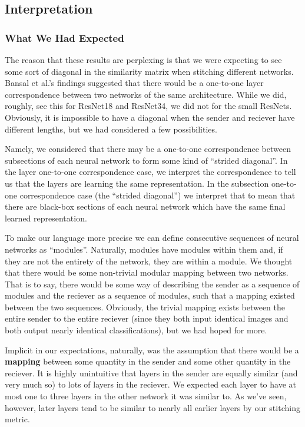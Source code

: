 \documentclass{article} %
\begin{document}
\subsection*{Interpretation}
\subsubsection*{What We Had Expected}
The reason that these results are perplexing is that we were expecting to see some sort of diagonal in the similarity matrix
when stitching
different networks. Bansal et al.'s findings suggested that there would be a one-to-one layer correspondence between
two networks of the same architecture. While we did, roughly, see this for ResNet18 and ResNet34, we did not for the
small ResNets. Obviously, it is impossible to have a diagonal when the sender and reciever have different lengths,
but we had considered a few possibilities.

Namely, we considered that there may be a one-to-one correspondence between subsections of each neural network to
form some kind of ``strided diagonal''. In the layer one-to-one correspondence case, we interpret the correspondence
to tell us that the layers are learning the same representation. In the subsection one-to-one correspondence case
(the ``strided diagonal'') we interpret that to mean that there are black-box sections of each neural network which
have the same final learned representation.

To make our language more precise we can define consecutive sequences of neural networks as ``modules''. Naturally,
modules have modules within them and, if they are not the entirety of the network, they are within a module. We thought
that there would be some non-trivial modular mapping between two networks. That is to say, there would be some way of
describing the sender as a sequence of modules and the reciever as a sequence of modules, such that a mapping existed
between the two sequences. Obviously, the trivial mapping exists between the entire sender to the entire reciever
(since they both input identical images and both output nearly identical classifications), but we had hoped for more.

Implicit in our expectations, naturally, was the assumption that there would be a \textbf{mapping} between some quantity
in the sender and some other quantity in the reciever. It is highly unintuitive that layers in the sender are equally
similar (and very much so) to lots of layers in the reciever. We expected each layer to have at most one to three layers
in the other network it was similar to. As we've seen, however, later layers tend to be similar to nearly all earlier layers
by our stitching metric.
\end{document}
